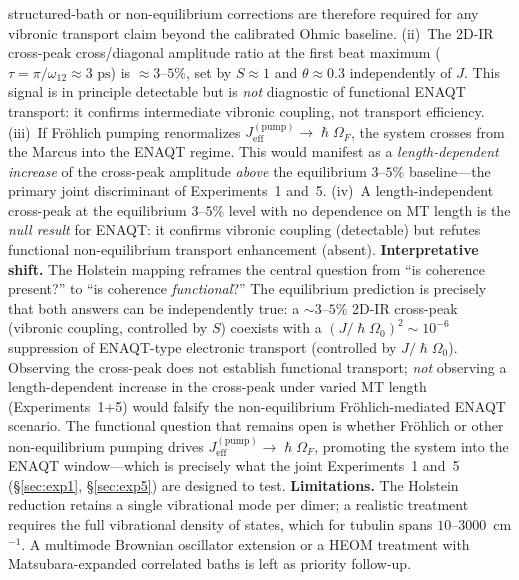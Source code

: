 \documentclass[twocolumn,10pt]{article}
\renewcommand{\hbar}{\hslash}
\newcommand{\ps}{\text{~ps}}
\begin{document}
structured-bath or non-equilibrium corrections are therefore required for
any vibronic transport claim beyond the calibrated Ohmic baseline.
(ii)~The 2D-IR cross-peak cross/diagonal amplitude ratio at the first beat
maximum ($\tau = \pi/\omega_{12} \approx 3\ps$) is $\approx 3$--$5\%$,
set by $S \approx 1$ and $\theta \approx 0.3$ independently of $J$.
This signal is in principle detectable but is \textit{not} diagnostic of
functional ENAQT transport: it confirms intermediate vibronic coupling,
not transport efficiency.
(iii)~If Fr\"ohlich pumping renormalizes
$J_{\text{eff}}^{(\text{pump})} \to \hbar\Omega_F$, the system crosses
from the Marcus into the ENAQT regime. This would manifest as a
\textit{length-dependent increase} of the cross-peak amplitude
\textit{above} the equilibrium $3$--$5\%$ baseline---the primary joint
discriminant of Experiments~1 and~5.
(iv)~A length-independent cross-peak at the equilibrium $3$--$5\%$ level
with no dependence on MT length is the \textit{null result} for ENAQT: it
confirms vibronic coupling (detectable) but refutes functional
non-equilibrium transport enhancement (absent).
\textbf{Interpretative shift.} The Holstein mapping reframes the
central question from ``is coherence present?'' to
``is coherence \textit{functional}?'' The equilibrium prediction is
precisely that both answers can be independently true: a
$\sim 3$--$5\%$ 2D-IR cross-peak (vibronic coupling, controlled by $S$)
coexists with a $(J/\hbar\Omega_0)^2 \sim 10^{-6}$ suppression of
ENAQT-type electronic transport (controlled by $J/\hbar\Omega_0$).
Observing the cross-peak does not establish functional transport;
\textit{not} observing a length-dependent increase in the cross-peak under
varied MT length (Experiments~1+5) would falsify the non-equilibrium
Fr\"ohlich-mediated ENAQT scenario. The functional question that remains open
is whether Fr\"ohlich or other non-equilibrium pumping drives
$J_{\text{eff}}^{(\text{pump})} \to \hbar\Omega_F$, promoting the system
into the ENAQT window---which is precisely what the joint Experiments~1
and~5 (\S\ref{sec:exp1}, \S\ref{sec:exp5}) are designed to test.
\textbf{Limitations.} The Holstein reduction retains a single vibrational
mode per dimer; a realistic treatment requires the full vibrational
density of states, which for tubulin spans $10\text{--}3000$~cm$^{-1}$. A
multimode Brownian oscillator extension \cite{Mukamel1995} or a HEOM
treatment with Matsubara-expanded correlated baths is left as priority
follow-up.

\end{document}
